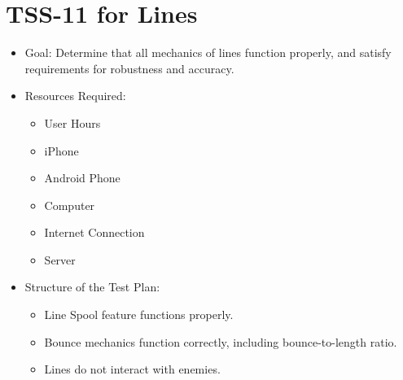 \section{TSS-11 for Lines}
\begin{itemize}
\item Goal: Determine that all mechanics of lines function properly, and satisfy requirements
for robustness and accuracy.

\item Resources Required:
\begin{itemize}
\item User Hours 
\item iPhone 
\item Android Phone 
\item Computer 
\item Internet Connection 
\item Server
\end{itemize}
\item Structure of the Test Plan: 

\begin{itemize}

\item Line Spool feature functions properly.
\item Bounce mechanics function correctly, including bounce-to-length ratio.
\item Lines do not interact with enemies.

\end{itemize}
\end{itemize}

